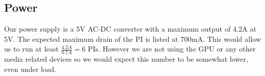 \subsection{Power}
Our power supply is a 5V AC-DC converter with a maximum output of 4.2A at 5V. The expected maximum drain of the PI is listed at 700mA\cite{raspi_power_drain}. This would allow us to run at least $\frac{4.2A}{0.7A}=6$ PIs.
However we are not using the GPU or any other media related devices so we would expect this number to be somewhat lower, even under load.
